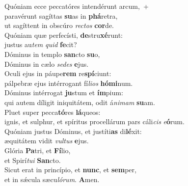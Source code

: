 \evenverse Quóniam ecce peccatóres intendérunt arcum,~+\\\evenverse  paravérunt sagíttas \textbf{su}as in \textbf{phá}retra,~\*\\
\evenverse ut sagíttent in obscúro \textit{re}\textit{ctos} \textbf{cor}de.\\
\oddverse Quóniam quæ perfecísti, \textbf{de}stru\textbf{xé}runt:~\*\\
\oddverse justus au\textit{tem} \textit{quid} \textbf{fe}cit?\\
\evenverse Dóminus in templo \textbf{san}cto \textbf{su}o,~\*\\
\evenverse Dóminus in cælo \textit{se}\textit{des} \textbf{e}jus.\\
\oddverse Oculi ejus in páupe\textbf{rem} re\textbf{spí}ciunt:~\*\\
\oddverse pálpebræ ejus intérrogant fí\textit{li}\textit{os} \textbf{hó}\textbf{mi}num.\\
\evenverse Dóminus intérrogat \textbf{ju}stum et \textbf{ím}pium:~\*\\
\evenverse qui autem díligit iniquitátem, odit á\textit{ni}\textit{mam} \textbf{su}am.\\
\oddverse Pluet super pecca\textbf{tó}res \textbf{lá}queos:~\*\\
\oddverse ignis, et sulphur, et spíritus procellárum pars cáli\textit{cis} \textit{e}\textbf{ó}rum.\\
\evenverse Quóniam justus Dóminus, et justíti\textbf{as} di\textbf{lé}xit:~\*\\
\evenverse æquitátem vidit \textit{vul}\textit{tus} \textbf{e}jus.\\
\oddverse Glória \textbf{Pa}tri, et \textbf{Fí}lio,~\*\\
\oddverse et Spirí\textit{tu}\textit{i} \textbf{San}cto.\\
\evenverse Sicut erat in princípio, et \textbf{nunc}, et \textbf{sem}per,~\*\\
\evenverse et in sǽcula sæcu\textit{ló}\textit{rum}. \textbf{A}men.\\
